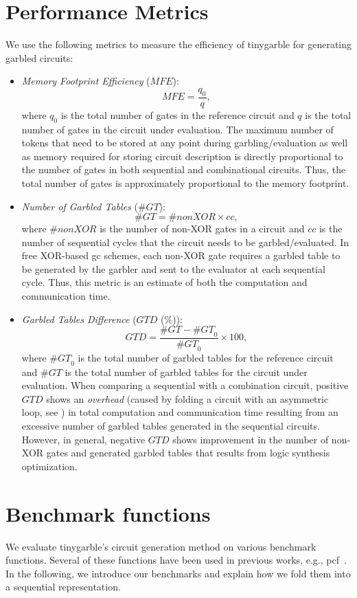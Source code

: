 \section{Performance Metrics}
We use the following metrics to measure the efficiency of \gls{tinygarble} for generating garbled circuits:

\begin{itemize}
\item
	\textit{Memory Footprint Efficiency} ($\mathit{MFE}$): $$\mathit{MFE} = \dfrac{q_{0}}{q},$$ where $q_{0}$ is the total number of gates in the reference circuit and $q$ is the total number of gates in the circuit under evaluation.
	The maximum number of tokens that need to be stored at any point during garbling/evaluation as well as memory required for storing circuit description is directly proportional to the number of gates in both sequential and combinational circuits.
	Thus, the total number of gates is approximately proportional to the memory footprint.

\item
	\textit{Number of Garbled Tables} ($\mathit{\#GT}$): $$\mathit{\#GT} = \#nonXOR\times cc,$$ where $\#nonXOR$ is the number of non-XOR gates in a circuit and $cc$ is the number of sequential cycles that the circuit needs to be garbled/evaluated.
	In free XOR-based \acrshort{gc} schemes, each non-XOR gate requires a garbled table to be generated by the garbler and sent to the evaluator at each sequential cycle.
	Thus, this metric is an estimate of both the computation and communication time.

\item
	\textit{Garbled Tables Difference} ($\mathit{GTD}$ (\%)): $$\mathit{GTD} = \dfrac{\mathit{\#GT} - \mathit{\#GT}_{0}}{\mathit{\#GT}_{0}} \times 100,$$ where $\mathit{\#GT}_{0}$ is the total number of garbled tables for the reference circuit and $\mathit{\#GT}$ is the total number of garbled tables for the circuit under evaluation.
	When comparing a sequential with a combination circuit, positive $\mathit{GTD}$ shows an \emph{overhead} (caused by folding a circuit with an asymmetric loop, see ) in total computation and communication time resulting from an excessive number of garbled tables generated in the sequential circuits.
	However, in general, negative $\mathit{GTD}$ shows improvement in the number of non-XOR gates and generated garbled tables that results from logic synthesis optimization.
\end{itemize}

\section{Benchmark functions}
We evaluate \gls{tinygarble}'s circuit generation method on various benchmark functions.
Several of these functions have been used in previous works, e.g., \gls{pcf}~\cite{kreuter2013pcf}.
In the following, we introduce our benchmarks and explain how we fold them into a sequential representation.

